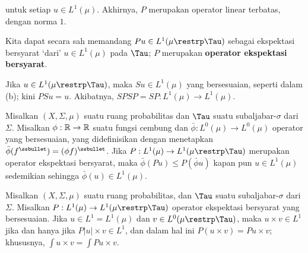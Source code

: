 \noindent untuk setiap $u\in L^1(\mu)$. Akhirnya, $P$ merupakan operator linear
terbatas, dengan norma $1$. 

 Kita dapat secara sah memandang
$Pu\in L^1(\mu\restrp\Tau)$ sebagai ekspektasi bersyarat `dari'
$u\in L^1(\mu)$ pada $\Tau$; $P$ merupakan {\bf operator ekspektasi
bersyarat}.

 Jika $u\in L^1(\mu\restrp\Tau)$, maka $Su\in L^1(\mu)$ yang bersesuaian, seperti dalam (b);
kini $PSu=u$. 
Akibatnya, $SPSP=SP:L^1(\mu)\to L^1(\mu)$.


 Misalkan $(X,\Sigma,\mu)$ suatu ruang
probabilitas dan $\Tau$ suatu subaljabar-$\sigma$ dari $\Sigma$.
Misalkan $\phi:\Bbb R\to\Bbb R$ suatu fungsi cembung dan
$\bar\phi:L^0(\mu)\to L^0(\mu)$ operator yang bersesuaian, yang
didefinisikan dengan menetapkan
$\bar\phi(f^{\ssbullet})=(\phi f)^{\ssbullet}$. Jika
$P:L^1(\mu)\to L^1(\mu\restrp\Tau)$ merupakan operator ekspektasi
bersyarat, maka $\bar\phi(Pu)\le P(\bar\phi u)$ kapan pun
$u\in L^1(\mu)$ sedemikian sehingga $\bar\phi(u)\in L^1(\mu)$.


 Misalkan $(X,\Sigma,\mu)$ suatu ruang
probabilitas, dan $\Tau$ suatu subaljabar-$\sigma$ dari $\Sigma$.
Misalkan $P:L^1(\mu)\to L^1(\mu\restrp\Tau)$ operator ekspektasi
bersyarat yang bersesuaian. Jika $u\in L^1=L^1(\mu)$ dan
$v\in L^0(\mu\restrp\Tau)$, maka $u\times v\in L^1$ jika dan hanya jika
$P|u|\times v\in L^1$, dan dalam hal ini
$P(u\times v)=Pu\times v$; khususnya,
$\int u\times v=\int Pu\times v$.

